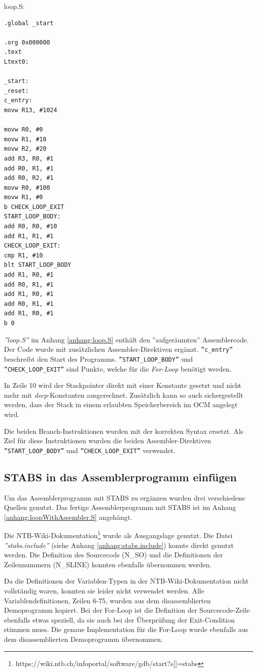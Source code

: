 \FloatBarrier

loop.S:
\begin{lstlisting}
.global _start

.org 0x000000
.text
Ltext0:

_start:
_reset:
c_entry:
movw R13, #1024

movw R0, #0
movw R1, #10
movw R2, #20
add R3, R0, #1
add R0, R1, #1
add R0, R2, #1
movw R0, #100
movw R1, #0
b CHECK_LOOP_EXIT	
START_LOOP_BODY:
add R0, R0, #10
add R1, R1, #1
CHECK_LOOP_EXIT:
cmp R1, #10
blt START_LOOP_BODY
add R1, R0, #1
add R0, R1, #1
add R1, R0, #1
add R0, R1, #1
add R1, R0, #1
b 0
\end{lstlisting}

\textit{''loop.S''} im Anhang \ref{anhang:loop.S} enthält den ''aufgeräumten'' Assemblercode.
Der Code wurde mit zusätzlichen Assembler-Direktiven ergänzt.
\texttt{''c\_entry''} beschreibt den Start des Programms.
\texttt{''START\_LOOP\_BODY''} und \texttt{''CHECK\_LOOP\_EXIT''} sind Punkte, welche für die \textit{For-Loop} benötigt werden.

In Zeile 10 wird der Stackpointer direkt mit einer Konstante gesetzt und nicht mehr mit \textit{deep}-Konstanten ausgerechnet.
Zusätzlich kann so auch sichergestellt werden, dass der Stack in einem erlaubten Speicherbereich im OCM angelegt wird.

Die beiden Branch-Instruktionen wurden mit der korrekten Syntax ersetzt.
Als Ziel für diese Instruktionen wurden die beiden Assembler-Direktiven \texttt{''START\_LOOP\_BODY''} und \texttt{''CHECK\_LOOP\_EXIT''} verwendet.


\subsection{STABS in das Assemblerprogramm einfügen}
Um das Assemblerprogramm mit STABS zu ergänzen wurden drei verschiedene Quellen genutzt.
Das fertige Assemblerprogramm mit STABS ist im Anhang \ref{anhang:loopWithAssembler.S} angehängt.

Die NTB-Wiki-Dokumentation\footnote{https://wiki.ntb.ch/infoportal/software/gdb/start?s[]=stabs} wurde als Ausgangslage genutzt.
Die Datei \textit{''stabs.include''} (siehe Anhang \ref{anhang:stabs.include}) konnte direkt genutzt werden.
Die Definition des Sourcecods (N\_SO) und die Definitionen der Zeilennummern (N\_SLINE) konnten ebenfalls übernommen werden.

Da die Definitionen der Variablen-Typen in der NTB-Wiki-Dokumentation nicht vollständig waren, konnten sie leider nicht verwendet werden.
Alle Variablendefinitionen, Zeilen 6-75, wurden aus dem disassemblierten Demoprogramm kopiert.
Bei der For-Loop ist die Definition der Sourcecode-Zeile ebenfalls etwas speziell, da sie auch bei der Überprüfung der Exit-Condition stimmen muss.
Die genaue Implementation für die For-Loop wurde ebenfalls aus dem disassemblierten Demoprogramm übernommen.

